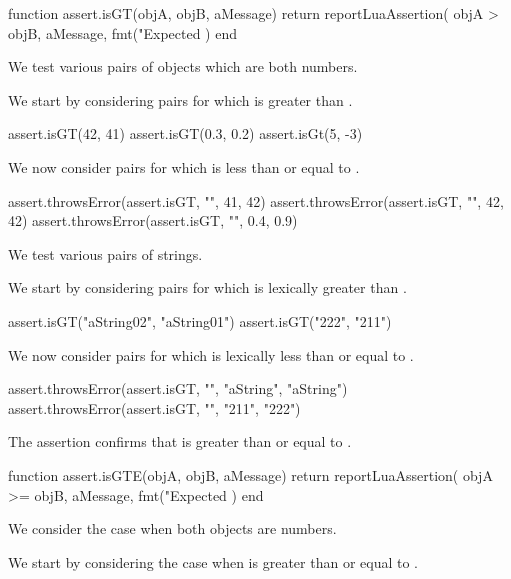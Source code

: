\startLuaCode
function assert.isGT(objA, objB, aMessage)
  return reportLuaAssertion(
    objA > objB,
    aMessage,
    fmt("Expected %
  )
end
\stopLuaCode


We test various pairs of objects which are both numbers.

We start by considering pairs for which  is greater than 
. 

\startLuaTest
  assert.isGT(42, 41)
  assert.isGT(0.3, 0.2)
  assert.isGt(5, -3)
\stopLuaTest

We now consider pairs for which  is less than or equal to 
. 

\startLuaTest
  assert.throwsError(assert.isGT, "", 41, 42)
  assert.throwsError(assert.isGT, "", 42, 42)
  assert.throwsError(assert.isGT, "", 0.4, 0.9)
\stopLuaTest
\stopTestCase


We test various pairs of strings.

We start by considering pairs for which  is lexically greater 
than . 

\startLuaTest
  assert.isGT("aString02", "aString01")
  assert.isGT("222", "211")
\stopLuaTest

We now consider pairs for which  is lexically less than or 
equal to . 

\startLuaTest
  assert.throwsError(assert.isGT, "", "aString", "aString")
  assert.throwsError(assert.isGT, "", "211", "222")
\stopLuaTest
\stopTestCase

\stopTestSuite


The  assertion confirms that  is greater 
than or equal to . 

\startLuaCode
function assert.isGTE(objA, objB, aMessage)
  return reportLuaAssertion(
    objA >= objB,
    aMessage,
    fmt("Expected %
  )
end
\stopLuaCode


We consider the case when both objects are numbers.

We start by considering the case when  is greater than or equal 
to . 


